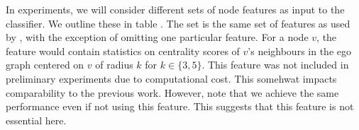 \documentclass[
	fontsize=10pt, %
	twoside=false, %
	secnumdepth=1, %
  toc=indentunnumbered %
]{kaobook}
\begin{document}



In experiments, we will consider different sets of node features as input to the
classifier. We outline these  in table
. The set  is the same set of
features as used by \nielsen{}, with the exception of omitting one particular
feature. For a node $v$, the feature would contain statistics on centrality
scores of $v$'s neighbours in the ego graph centered on $v$ of radius $k$ for $k
\in \{3,5\}$. This feature was not included in preliminary experiments due to
computational cost. This somehwat impacts comparability to the previous work.
However, note that we achieve the same performance even if not using this
feature. This suggests that this feature is not essential here.
\end{document}
